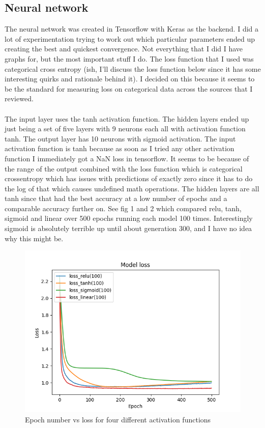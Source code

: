 \documentclass[conference]{IEEEtran}
\begin{document}
\subsection{Neural network}
The neural network was created in Tensorflow with Keras as the backend. I did a lot of experimentation trying to work out which particular parameters ended up creating the best and quickest convergence. Not everything that I did I have graphs for, but the most important stuff I do. The loss function that I used was categorical cross entropy (ish, I'll discuss the loss function below since it has some interesting quirks and rationale behind it). I decided on this because it seems to be the standard for measuring loss on categorical data across the sources that I reviewed.
\\\\
The input layer uses the tanh activation function. The hidden layers ended up just being a set of five layers with 9 neurons each all with activation function tanh. The output layer has 10 neurons with sigmoid activation. The input activation function is tanh because as soon as I tried any other activation function I immediately got a NaN loss in tensorflow. It seems to be because of the range of the output combined with the loss function which is categorical crossentropy which has issues with predictions of exactly zero since it has to do the log of that which causes undefined math operations. The hidden layers are all tanh since that had the best accuracy at a low number of epochs and a comparable accuracy further on. See fig 1 and 2 which compared relu, tanh, sigmoid and linear over 500 epochs running each model 100 times. Interestingly sigmoid is absolutely terrible up until about generation 300, and I have no idea why this might be.
\begin{figure}
  \includegraphics[width=\linewidth]{figs/different_activation_types_loss.png}
  \caption{Epoch number vs loss for four different activation functions}
  \label{fig:activation_type_loss}
\end{figure}
\end{document}
